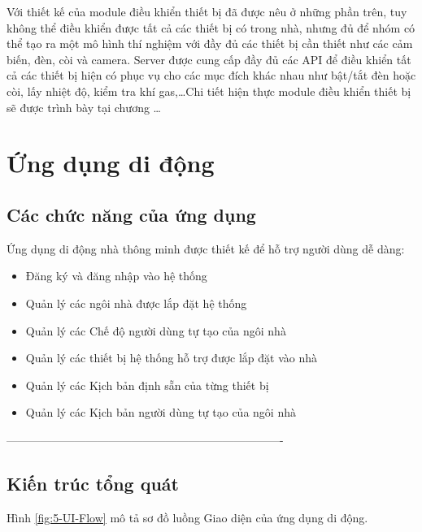 \documentclass[11pt,a4paper,oneside]{book}
\begin{document}
Với thiết kế của module điều khiển thiết bị đã được nêu ở những phần trên, tuy không thể điều khiển được tất cả các thiết bị có trong nhà, nhưng đủ để nhóm có thể tạo ra một mô hình thí nghiệm với đầy đủ các thiết bị cần thiết như các cảm biến, đèn, còi và camera. Server được cung cấp đầy đủ các API để điều khiển tất cả các thiết bị hiện có phục vụ cho các mục đích khác nhau như bật/tắt đèn hoặc còi, lấy nhiệt độ, kiểm tra khí gas,…Chi tiết hiện thực module điều khiển thiết bị sẽ được trình bày tại chương …


\chapter{Ứng dụng di động}

\newpage
\section{Các chức năng của ứng dụng}
Ứng dụng di động nhà thông minh được thiết kế để hỗ trợ người dùng dễ dàng:
\begin{itemize}[topsep=1mm,itemsep=-0.5mm]
\item Đăng ký và đăng nhập vào hệ thống
\item Quản lý các ngôi nhà được lắp đặt hệ thống
\item Quản lý các Chế độ người dùng tự tạo của ngôi nhà
\item Quản lý các thiết bị hệ thống hỗ trợ được lắp đặt vào nhà
\item Quản lý các Kịch bản định sẵn của từng thiết bị
\item Quản lý các Kịch bản người dùng tự tạo của ngôi nhà
\vspace{1mm}
\end{itemize}

-------------------------------------------------------------------------%
\section{Kiến trúc tổng quát}
Hình \ref{fig:5-UI-Flow} mô tả sơ đồ luồng Giao diện của ứng dụng di động.
\end{document}
